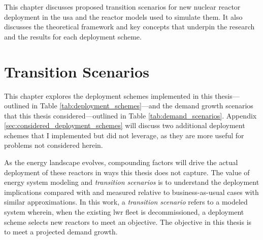 This chapter discusses proposed transition scenarios for new nuclear reactor deployment in the \gls{usa} and the reactor models used to simulate them. It also discusses the theoretical framework and key concepts that underpin the research and the results for each deployment scheme.

\section{Transition Scenarios}
\label{sec:transition_scenarios}

This chapter explores the deployment schemes implemented in this thesis---outlined in Table \ref{tab:deployment_schemes}---and the demand growth scenarios that this thesis considered---outlined in Table \ref{tab:demand_scenarios}. Appendix \ref{sec:considered_deployment_schemes} will discuss two additional deployment schemes that I implemented but did not leverage, as they are more useful for problems not considered herein.

As the energy landscape evolves, compounding factors will drive the actual deployment of these reactors in ways this thesis does not capture. The value of energy system modeling and \textit{transition scenarios} is to understand the deployment implications compared with and measured relative to business-as-usual cases with similar approximations. In this work, a \textit{transition scenario} refers to a modeled system wherein, when the existing \gls{lwr} fleet is decommissioned, a deployment scheme selects new reactors to meet an objective. The objective in this thesis is to meet a projected demand growth.

